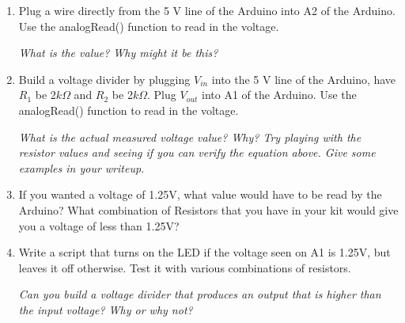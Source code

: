 \documentclass[12pt]{article}
\begin{document}
	\begin{enumerate}
        \item Plug a wire directly from the 5 V line of the Arduino into A2 of the Arduino.  Use the analogRead() function to read in the voltage.  
        \begin{center}
        \textit{What is the value? Why might it be this?}
        \end{center}
        
    	\item Build a voltage divider by plugging $V_{in}$ into the 5 V line of the Arduino, have $R_1$ be 2$k\Omega$ and $R_2$ be 2$k\Omega$. Plug $V_{out}$ into A1 of the Arduino.  Use the analogRead() function to read in the voltage.  
        
        \begin{center}
        \textit{What is the actual measured voltage value? Why?  Try playing with the resistor values and seeing if you can verify the equation above. Give some examples in your writeup.}
        \end{center}
        
		\item If you wanted a voltage of 1.25V, what value would have to be read by the Arduino? What combination of Resistors that you have in your kit would give you a voltage of less than 1.25V?
        \item Write a script that turns on the LED if the voltage seen on A1 is 1.25V, but leaves it off otherwise. Test it with various combinations of resistors. %
		
		
		
		
		
	
		\begin{center}
			\textit{Can you build a voltage divider that produces an output that is higher than the input voltage? Why or why not?}
		\end{center}
	
	\end{enumerate}
\end{document}

